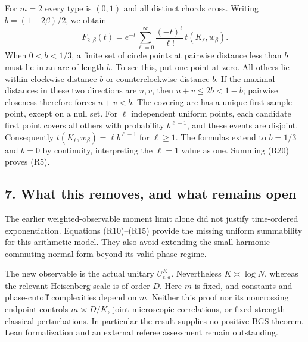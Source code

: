 For \(m=2\) every type is \((0,1)\) and all distinct chords cross.
Writing \(b=(1-2\beta)/2\), we obtain
\[
 F_{2,\beta}(t)=e^{-t}\sum_{\ell=0}^\infty
                  \frac{(-t)^\ell}{\ell!}\,t(K_\ell,w_\beta).
                                                               \tag{R20}
\]
When \(0<b<1/3\), a finite set of circle points at pairwise distance less
than \(b\) must lie in an arc of length \(b\). To see this, put one point at
zero. All others lie within clockwise distance \(b\) or counterclockwise
distance \(b\). If the maximal distances in these two directions are \(u,v\),
then \(u+v\le2b<1-b\); pairwise closeness therefore forces \(u+v<b\).
The covering arc has a unique first sample point, except on a null set.
For \(\ell\) independent uniform points, each candidate first point covers
all others with probability \(b^{\ell-1}\), and these events are disjoint.
Consequently \(t(K_\ell,w_\beta)=\ell b^{\ell-1}\) for \(\ell\ge1\).
The formulas extend to \(b=1/3\) and \(b=0\) by continuity, interpreting
the \(\ell=1\) value as one. Summing (R20) proves (R5).

\hypertarget{harmonic-returns-what-this-removes-and-what-remains-open}{%
\subsection{7. What this removes, and what remains open}\label{harmonic-returns-what-this-removes-and-what-remains-open}}

The earlier weighted-observable moment limit alone did not justify
time-ordered exponentiation. Equations (R10)--(R15) provide the missing
uniform summability for this arithmetic model. They also avoid extending
the small-harmonic commuting normal form beyond its valid phase regime.

The new observable is the actual unitary \(U_{\epsilon,a}^K\). Nevertheless
\(K\asymp\log N\), whereas the relevant Heisenberg scale is of order \(D\).
Here \(m\) is fixed, and constants and phase-cutoff complexities depend on
\(m\). Neither this proof nor its noncrossing endpoint controls
\(m\asymp D/K\), joint microscopic correlations, or fixed-strength classical
perturbations. In particular the result supplies no positive BGS theorem.
Lean formalization and an external referee assessment remain outstanding.
